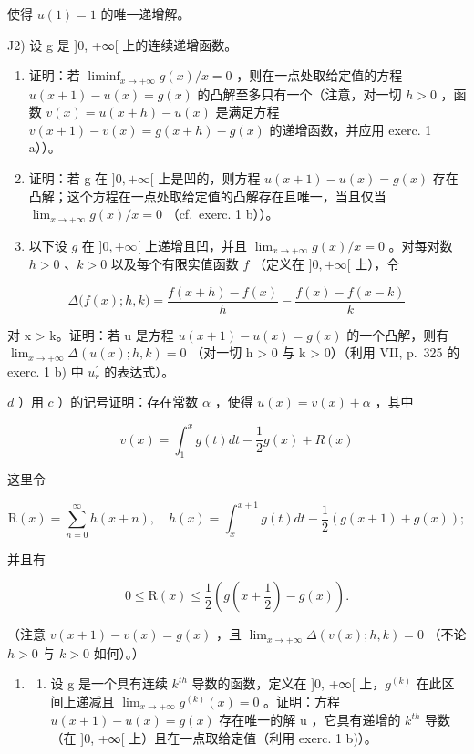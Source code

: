 使得 \(u(1)=1\) 的唯一递增解。

J2) 设 g 是 {]}0, +∞{[} 上的连续递增函数。

\begin{enumerate}
\def\labelenumi{\alph{enumi})}
\item
  证明：若 \(\liminf_{x\to +\infty}g(x) / x = 0\) ，则在一点处取给定值的方程 \(u(x + 1) - u(x) = g(x)\) 的凸解至多只有一个（注意，对一切 \(h > 0\) ，函数 \(v(x) = u(x + h) - u(x)\) 是满足方程 \(v(x + 1) - v(x) = g(x + h) - g(x)\) 的递增函数，并应用 exerc. 1 a））。
\item
  证明：若 g 在 \(]0, +\infty[\) 上是凹的，则方程 \(u(x+1) - u(x) = g(x)\) 存在凸解；这个方程在一点处取给定值的凸解存在且唯一，当且仅当 \(\lim_{x \to +\infty} g(x)/x = 0\) （cf.~exerc. 1 b））。
\item
  以下设 \(g\) 在 \(]0, +\infty[\) 上递增且凹，并且 \(\lim_{x \to +\infty} g(x) / x = 0\) 。对每对数 \(h > 0\) 、\(k > 0\) 以及每个有限实值函数 \(f\) （定义在 \(]0, +\infty[\) 上），令
\end{enumerate}

\[
\varDelta \Big (f (x); h, k \Big) = \frac {f (x + h) - f (x)}{h} - \frac {f (x) - f (x - k)}{k}
\]

对 x \textgreater{} k。证明：若 u 是方程 \(u(x + 1) - u(x) = g(x)\) 的一个凸解，则有 \(\lim_{x \to +\infty} \Delta(u(x); h, k) = 0\) （对一切 h \textgreater{} 0 与 k \textgreater{} 0）（利用 VII, p.~325 的 exerc. 1 b) 中 \(u_{r}^{\prime}\) 的表达式）。

\(d\) ）用 \(c\) ）的记号证明：存在常数 \(\alpha\) ，使得 \(u(x) = v(x) + \alpha\) ，其中

\[
v (x) = \int_ {1} ^ {x} g (t) d t - \frac {1}{2} g (x) + R (x)
\]

这里令

\[
\mathrm{R} (x) = \sum_ {n = 0} ^ {\infty} h (x + n), \quad h (x) = \int_ {x} ^ {x + 1} g (t) d t - \frac {1}{2} (g (x + 1) + g (x));
\]

并且有

\[
0 \leqslant \mathrm{R} (x) \leqslant \frac {1}{2} (g (x + \frac {1}{2}) - g (x)).
\]

（注意 \(v(x + 1) - v(x) = g(x)\) ，且 \(\lim_{x\to +\infty}\Delta (v(x);h,k) = 0\) （不论 \(h > 0\) 与 \(k > 0\) 如何）。）

\begin{enumerate}
\def\labelenumi{\arabic{enumi})}
\setcounter{enumi}{2}
\tightlist
\item
  \begin{enumerate}
  \def\labelenumii{\alph{enumii})}
  \tightlist
  \item
    设 g 是一个具有连续 \(k^{th}\) 导数的函数，定义在 {]}0, +∞{[} 上，\(g^{(k)}\) 在此区间上递减且 \(\lim_{x\to+\infty}g^{(k)}(x)=0\) 。证明：方程 \(u(x+1)-u(x)=g(x)\) 存在唯一的解 u ，它具有递增的 \(k^{th}\) 导数（在 {]}0, +∞{[} 上）且在一点取给定值（利用 exerc. 1 b)）。
  \end{enumerate}
\end{enumerate}

